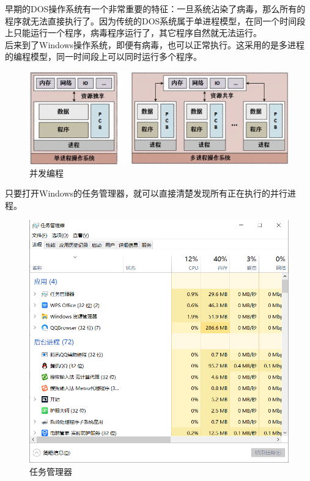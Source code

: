 早期的DOS操作系统有一个非常重要的特征：一旦系统沾染了病毒，那么所有的程序就无法直接执行了。因为传统的DOS系统属于单进程模型，在同一个时间段上只能运行一个程序，病毒程序运行了，其它程序自然就无法运行。\\

后来到了Windows操作系统，即便有病毒，也可以正常执行。这采用的是多进程的编程模型，同一时间段上可以同时运行多个程序。

\begin{figure}[H]
	\centering
	\includegraphics[scale=0.6]{img/C11/11-1/3.png}
	\caption{并发编程}
\end{figure}

只要打开Windows的任务管理器，就可以直接清楚发现所有正在执行的并行进程。

\begin{figure}[H]
	\centering
	\includegraphics[scale=0.7]{img/C11/11-1/4.png}
	\caption{任务管理器}
\end{figure}

